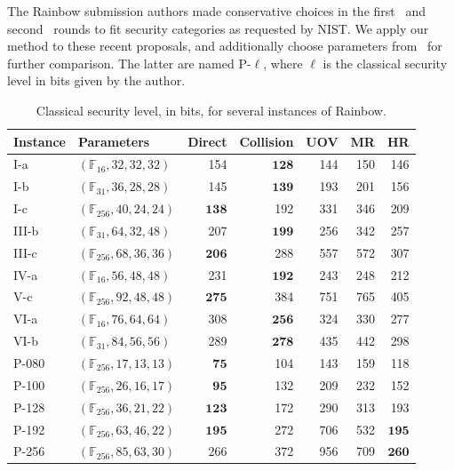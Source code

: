 \documentclass[english]{ufsc-thesis-rn46-2019/ufsc-thesis-rn46-2019}
\theoremstyle{definition}
\begin{document}
The Rainbow submission authors made conservative choices in the
first~\cite{Ding:201712} and second~\cite{Ding:201901} rounds to fit security
categories as requested by NIST\@. We apply our method to these recent
proposals, and additionally choose parameters
from~\cite[Tabs.~6.12,~9.8]{Petzoldt:201307} for further comparison. The latter
are named P-$\ell$, where $\ell$ is the classical security level in bits given
by the author.

\begin{table}[htbp]
  \renewcommand{\arraystretch}{1.2}
  \setlength{\tabcolsep}{7pt}
  \centering
  \caption{Classical security level, in bits, for several instances of
    Rainbow.}\label{tab:sec}
  \begin{tabular}{*{2}{l}*{5}{r}}
    \toprule
    Instance & Parameters                       & Direct
      & Collision       & UOV & MR  & HR              \\
    \midrule
    I-a      & $(\mathbb{F}_{ 16}, 32, 32, 32)$ & 154
      & $\mathbf{ 128}$ & 144 & 150 & 146             \\
    I-b      & $(\mathbb{F}_{ 31}, 36, 28, 28)$ & 145
      & $\mathbf{ 139}$ & 193 & 201 & 156             \\
    I-c      & $(\mathbb{F}_{256}, 40, 24, 24)$ & $\mathbf{ 138}$
      & 192             & 331 & 346 & 209             \\
    III-b    & $(\mathbb{F}_{ 31}, 64, 32, 48)$ & 207
      & $\mathbf{ 199}$ & 256 & 342 & 257             \\
    III-c    & $(\mathbb{F}_{256}, 68, 36, 36)$ & $\mathbf{ 206}$
      & 288             & 557 & 572 & 307             \\
    IV-a     & $(\mathbb{F}_{ 16}, 56, 48, 48)$ & 231
      & $\mathbf{ 192}$ & 243 & 248 & 212             \\
    V-c      & $(\mathbb{F}_{256}, 92, 48, 48)$ & $\mathbf{ 275}$
      & 384             & 751 & 765 & 405             \\
    VI-a     & $(\mathbb{F}_{ 16}, 76, 64, 64)$ & 308
      & $\mathbf{ 256}$ & 324 & 330 & 277             \\
    VI-b     & $(\mathbb{F}_{ 31}, 84, 56, 56)$ & 289
      & $\mathbf{ 278}$ & 435 & 442 & 298             \\
    P-080    & $(\mathbb{F}_{256}, 17, 13, 13)$ & $\mathbf{  75}$
      & 104             & 143 & 159 & 118             \\
    P-100    & $(\mathbb{F}_{256}, 26, 16, 17)$ & $\mathbf{  95}$
      & 132             & 209 & 232 & 152             \\
    P-128    & $(\mathbb{F}_{256}, 36, 21, 22)$ & $\mathbf{ 123}$
      & 172             & 290 & 313 & 193             \\
    P-192    & $(\mathbb{F}_{256}, 63, 46, 22)$ & $\mathbf{ 195}$
      & 272             & 706 & 532 & $\mathbf{ 195}$ \\
    P-256    & $(\mathbb{F}_{256}, 85, 63, 30)$ & 266
      & 372             & 956 & 709 & $\mathbf{ 260}$ \\
    \bottomrule
  \end{tabular}
\end{table}
\end{document}
